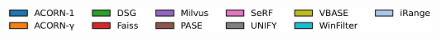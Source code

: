 \documentclass[sigconf, nonacm]{acmart}
\begin{document}
{	
	
	


	\begin{figure}[t]
		\centering
		
		
		\hspace*{5pt}
		\includegraphics[width=0.98\columnwidth]{figures/indexData/rangeFilter_legend_only.pdf}
		
		

\end{figure}}
\end{document}
